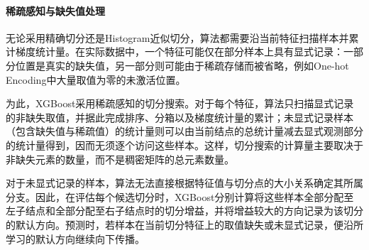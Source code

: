 \paragraph{稀疏感知与缺失值处理}
无论采用精确切分还是Histogram近似切分，算法都需要沿当前特征扫描样本并累计梯度统计量。在实际数据中，一个特征可能仅在部分样本上具有显式记录：一部分位置是真实的缺失值，另一部分则可能由于稀疏存储而被省略，例如One-hot Encoding中大量取值为零的未激活位置。\par
为此，XGBoost采用稀疏感知的切分搜索。对于每个特征，算法只扫描显式记录的非缺失取值，并据此完成排序、分箱以及梯度统计量的累计；未显式记录样本（包含缺失值与稀疏值）的统计量则可以由当前结点的总统计量减去显式观测部分的统计量得到，因而无须逐个访问这些样本。这样，切分搜索的计算量主要取决于非缺失元素的数量，而不是稠密矩阵的总元素数量。\par
对于未显式记录的样本，算法无法直接根据特征值与切分点的大小关系确定其所属分支。因此，在评估每个候选切分时，XGBoost分别计算将这些样本全部分配至左子结点和全部分配至右子结点时的切分增益，并将增益较大的方向记录为该切分的默认方向。预测时，若样本在当前切分特征上的取值缺失或未显式记录，便沿所学习的默认方向继续向下传播。
